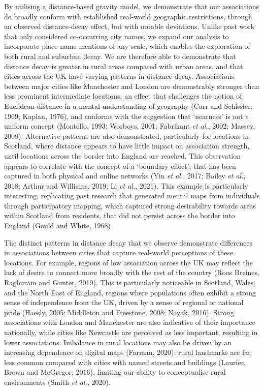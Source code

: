 \documentclass[
  letterpaper,
  11pt,
  english,
  onehalfspacing,
  headsepline]{MastersDoctoralThesis}
\begin{document}
By utilising a distance-based gravity model, we demonstrate that our
associations do broadly conform with established real-world geographic
restrictions, through an observed distance-decay effect, but with
notable deviations. Unlike past work that only considered co-occurring
city names, we expand our analysis to incorporate place name mentions of
any scale, which enables the exploration of both rural and suburban
decay. We are therefore able to demonstrate that distance decay is
greater in rural areas compared with urban areas, and that cities across
the UK have varying patterns in distance decay. Associations between
major cities like Manchester and London are demonstrably stronger than
less prominent intermediate locations, an effect that challenges the
notion of Euclidean distance in a mental understanding of geography
(Carr and Schissler, 1969; Kaplan, 1976), and conforms with the
suggestion that `nearness' is not a uniform concept (Montello, 1993;
Worboys, 2001; Fabrikant \emph{et al.}, 2002; Massey, 2008). Alternative
patterns are also demonstrated, particularly for locations in Scotland,
where distance appears to have little impact on association strength,
until locations across the border into England are reached. This
observation appears to correlate with the concept of a `boundary
effect', that has been captured in both physical and online networks
(Yin \emph{et al.}, 2017; Bailey \emph{et al.}, 2018; Arthur and
Williams, 2019; Li \emph{et al.}, 2021). This example is particularly
interesting, replicating past research that generated mental maps from
individuals through participatory mapping, which captured strong
desirability towards areas within Scotland from residents, that did not
persist across the border into England (Gould and White, 1968)

The distinct patterns in distance decay that we observe demonstrate
differences in associations between cities that capture real-world
perceptions of these locations. For example, regions of low association
across the UK may reflect the lack of desire to connect more broadly
with the rest of the country (Roos Breines, Raghuram and Gunter, 2019).
This is particularly noticeable in Scotland, Wales, and the North East
of England, regions where populations often exhibit a strong sense of
independence from the UK, driven by a sense of regional or national
pride (Haesly, 2005; Middleton and Freestone, 2008; Nayak, 2016). Strong
associations with London and Manchester are also indicative of their
importance nationally, while cities like Newcastle are perceived as less
important, resulting in lower associations. Imbalance in rural locations
may also be driven by an increasing dependence on digital maps (Farman,
2020); rural landmarks are far less common compared with cities with
named streets and buildings (Laurier, Brown and McGregor, 2016),
limiting our ability to conceptualise rural environments (Smith \emph{et
al.}, 2020).
\end{document}
